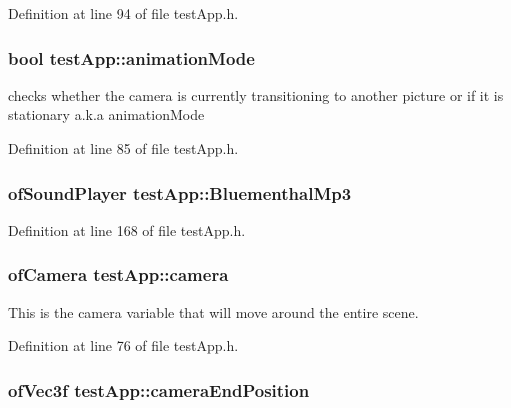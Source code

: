 Definition at line 94 of file test\-App.\-h.

\hypertarget{classtest_app_a2a5d49fd1f7f50f745f56095a1fa0099}{
\subsubsection[{animation\-Mode}]{\setlength{\rightskip}{0pt plus 5cm}bool test\-App\-::animation\-Mode}}\label{classtest_app_a2a5d49fd1f7f50f745f56095a1fa0099}


checks whether the camera is currently transitioning to another picture or if it is stationary a.\-k.\-a animation\-Mode 



Definition at line 85 of file test\-App.\-h.

\hypertarget{classtest_app_af696fd13ee9ecb38ac0ba0b72543ce06}{
\subsubsection[{Bluementhal\-Mp3}]{\setlength{\rightskip}{0pt plus 5cm}of\-Sound\-Player test\-App\-::\-Bluementhal\-Mp3}}\label{classtest_app_af696fd13ee9ecb38ac0ba0b72543ce06}


Definition at line 168 of file test\-App.\-h.

\hypertarget{classtest_app_a0278ee237cbbd881252d6273b131bb55}{
\subsubsection[{camera}]{\setlength{\rightskip}{0pt plus 5cm}of\-Camera test\-App\-::camera}}\label{classtest_app_a0278ee237cbbd881252d6273b131bb55}


This is the camera variable that will move around the entire scene. 



Definition at line 76 of file test\-App.\-h.

\hypertarget{classtest_app_ad3319d9cd3cb00e898f4f602b879efad}{
\subsubsection[{camera\-End\-Position}]{\setlength{\rightskip}{0pt plus 5cm}of\-Vec3f test\-App\-::camera\-End\-Position}}\label{classtest_app_ad3319d9cd3cb00e898f4f602b879efad}


